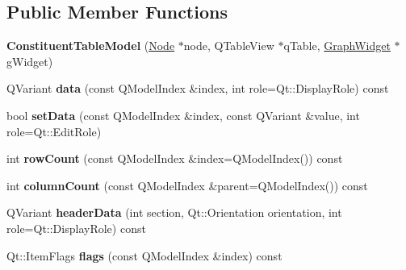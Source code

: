 \subsection*{Public Member Functions}
\begin{DoxyCompactItemize}
\item 
\mbox{\label{class_constituent_table_model_a4e73e1c240130e6d76deaebb9c738c1d}} 
{\bfseries Constituent\+Table\+Model} (\hyperlink{class_node}{Node} $\ast$node, Q\+Table\+View $\ast$q\+Table, \hyperlink{class_graph_widget}{Graph\+Widget} $\ast$g\+Widget)
\item 
\mbox{\label{class_constituent_table_model_a96715dbe35d8fbac567ce5ee3e77eba4}} 
Q\+Variant {\bfseries data} (const Q\+Model\+Index \&index, int role=Qt\+::\+Display\+Role) const
\item 
\mbox{\label{class_constituent_table_model_ac85e40d3eb9a97c5264ee196f548e931}} 
bool {\bfseries set\+Data} (const Q\+Model\+Index \&index, const Q\+Variant \&value, int role=Qt\+::\+Edit\+Role)
\item 
\mbox{\label{class_constituent_table_model_a597131fb98980e15311b6ba811dbc68d}} 
int {\bfseries row\+Count} (const Q\+Model\+Index \&index=Q\+Model\+Index()) const
\item 
\mbox{\label{class_constituent_table_model_ada62c7882273c417aa5015591088be66}} 
int {\bfseries column\+Count} (const Q\+Model\+Index \&parent=Q\+Model\+Index()) const
\item 
\mbox{\label{class_constituent_table_model_a5f3e5a83d8483ce4084e52ec8e562507}} 
Q\+Variant {\bfseries header\+Data} (int section, Qt\+::\+Orientation orientation, int role=Qt\+::\+Display\+Role) const
\item 
\mbox{\label{class_constituent_table_model_a28684fbdc4e44e4d0ea08cd1075bd6ff}} 
Qt\+::\+Item\+Flags {\bfseries flags} (const Q\+Model\+Index \&index) const
\item 
\mbox{\label{class_constituent_table_model_acfaa37a39bf5001d4f48e198f1b89682}} 

\end{DoxyCompactItemize}
